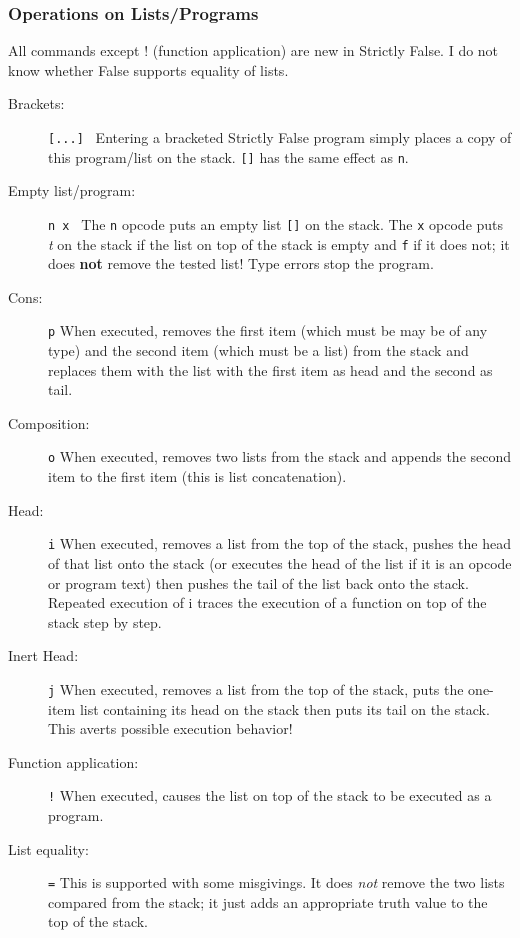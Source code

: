 \documentclass[12pt]{article}
\begin{document}
\subsubsection{Operations on Lists/Programs}

All commands except ! (function application) are new in Strictly False.
I do not know whether False supports equality of lists.

\begin{description}

\item[Brackets:] {\tt [...] }  Entering a bracketed Strictly False
program simply places a copy of this program/list on the stack. {\tt []}
has the same effect as {\tt n}.

\item[Empty list/program:]  {\tt n x }  The {\tt n} opcode puts
an empty list {\tt []} on the stack.  The {\tt x} opcode puts {\em t}
on the stack if the list on top of the stack is empty and {\tt f}
if it does not; it does {\bf not} remove the tested list!
Type errors stop the program.

\item[Cons:]  {\tt p} When executed, removes the first item (which
must be may be of any type) and the second item (which must be a list) from
the stack and replaces them with the list with the first item
as head and the second as tail.

\item[Composition:]  {\tt o} When executed, removes two lists from the
stack and appends the second item to the first item (this is list
concatenation).

\item[Head:] {\tt i} When executed, removes a list from the top of the
stack, pushes the head of that list onto the stack (or executes the
head of the list if it is an opcode or program text) then pushes the
tail of the list back onto the stack.  Repeated execution of i traces
the execution of a function on top of the stack step by step.

\item[Inert Head:]  {\tt j} When executed, removes a list from the top of
the stack, puts the one-item list containing its head on the stack
then puts its tail on the stack.  This averts possible execution
behavior!

\item[Function application:]  {\tt !}  When executed, causes the
list on top of the stack to be executed as a program.

\item[List equality:]  {\tt =} This is supported with some misgivings.
It does {\em not} remove the two lists compared from the stack; it just
adds an appropriate truth value to the top of the stack.

\end{description}
\end{document}
